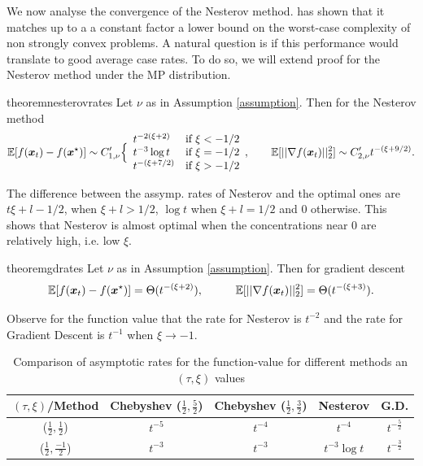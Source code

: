 \documentclass{article}
\begin{document}
We now analyse the convergence of the Nesterov method. \cite{nesterov2003introductory} has shown that it matches up to a a constant factor a lower bound on the worst-case complexity of non strongly convex problems. A natural question is if this performance would translate to good average case rates. To do so, we will extend \citet{paquette2020halting} proof for the Nesterov method under the MP distribution.  
\begin{restatable}{theorem}{nesterovrates} \label{the: neste rates}
Let $\nu$ as in Assumption \ref{assumption}. Then for the Nesterov method
\begin{equation}
    \mathbb{E}[f({\boldsymbol x}_t)-f({\boldsymbol x}^\star)]\sim C'_{1,\nu}
    \Big\{\begin{array}{ll}
		  t^{-2(\xi+2)}& \mbox{if } 
		  \xi<-1/2\\
		  t^{-3}\log t& \mbox{if } 
		  \xi=-1/2\\
		  t^{-(\xi+7/2)}& \mbox{if } 
		  \xi>-1/2
	\end{array}, \qquad 
	\mathbb{E}[||\nabla f({\boldsymbol x}_t)||^2_2] \sim C'_{2,\nu}
		  t^{-(\xi+9/2)}.
\end{equation}
\end{restatable}

The difference between the assymp. rates of Nesterov and the optimal ones are $t{\xi+l-1/2}$, when $\xi+l>1/2$, $\log t$ when $\xi+l=1/2$ and $0$ otherwise.
This shows that Nesterov is almost optimal when the concentrations near $0$ are relatively high, i.e. low $\xi$.

\begin{restatable}{theorem}{gdrates} \label{the: gd rates}
Let $\nu$ as in Assumption \ref{assumption}. Then for gradient descent
\begin{equation}
\mathbb{E}[f({\boldsymbol x}_t)-f({\boldsymbol x}^\star)]=\Theta(t^{-(\xi+2)}), \hspace{1 cm}
	\mathbb{E}[||\nabla f({\boldsymbol x}_t)||^2_2] =\Theta(t^{-(\xi+3)}).
\end{equation}

\end{restatable}

Observe for the function value that the rate for Nesterov is $t^{-2}$ and the rate for Gradient Descent is $t^{-1}$ when $\xi \rightarrow -1$. 

\begin{table}[t]
    \centering
    \begin{tabular}{c|c|c|c|c}
         $(\tau,\xi)$/Method& Chebyshev ($\frac{1}{2},\frac{5}{2}$) & Chebyshev ($\frac{1}{2},\frac{3}{2}$) &  Nesterov  & G.D. \\
         \hline
         ($\frac{1}{2},\frac{1}{2}$)&$t^{-5}$ & $t^{-4}$ & $t^{-4}$ & $t^{-\frac{5}{2}}$\\
         \hline
         ($\frac{1}{2},\frac{-1}{2}$)&$t^{-3}$ & $t^{-3}$ & $t^{-3}\log t$ & $t^{-\frac{3}{2}}$
    \end{tabular}
    \caption{Comparison of asymptotic rates for the function-value for different methods an $(\tau,\xi)$ values}
    \label{tab:theoretic rates}
\end{table}
\end{document}
